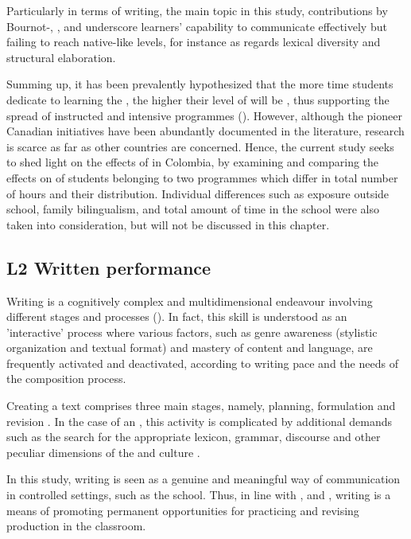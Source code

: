 \documentclass[output=paper]{langsci/langscibook}
\begin{document}
Particularly in terms of writing, the main topic in this study, contributions by Bournot-\citet{Bournot-Trites2007}, \citet{CollinsWhite2011},\citet{TurnbullEtAl1998} and \citet{Lightbown2012} underscore learners’ capability to communicate effectively but failing to reach native-like levels, for instance as regards lexical diversity and structural elaboration.  

Summing up, it has been prevalently hypothesized that the more time students dedicate to learning the , the higher their level of  will be \citep{Stern1985}, thus supporting the spread of instructed  and intensive programmes (\citealt{SerranoEtAl2011,Lightbown2012}). However, although the pioneer Canadian initiatives have been abundantly documented in the  literature, research is scarce as far as other countries are concerned. Hence, the current study seeks to shed light on the effects of   in Colombia, by examining and comparing the effects on  of students belonging to two programmes which differ in total number of hours and their distribution. Individual differences such as  exposure outside school, family bilingualism, and total amount of time in the school were also taken into consideration, but will not be discussed in this chapter.

\subsection{L2 Written performance}
\largerpage
Writing is a cognitively complex and multidimensional endeavour involving different stages and processes (\citealt{Manchón2013,Ortega2012}). In fact, this skill is understood as an 'interactive' process where various factors, such as genre awareness (stylistic organization and textual format) and mastery of content and language, are frequently activated and deactivated, according to writing pace and the needs of the composition process.

Creating a text comprises three main stages, namely, planning, formulation and revision \citep{Manchón2009,Manchón2013,SilvaMatsuda2005}. In the case of an , this activity is complicated by additional demands such as the search for the appropriate lexicon, grammar, discourse and other peculiar dimensions of the  and culture \citep{Manchón2009}. 

In this study, writing is seen as a genuine and meaningful way of communication in controlled  settings, such as the  school. Thus, in line with \citet{Harklau2002}, \citet{Ortega2012} and \citet{Williams2012}, writing is a means of promoting permanent opportunities for practicing and revising  production in the classroom. 
\end{document}
